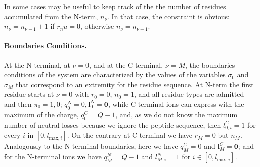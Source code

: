 In some cases may be useful to keep track of the the number of residues accumulated from the N-term, $n_\nu$. In that case, the constraint is obvious: $n_\nu=n_{\nu-1}+1$ if $r_nu=0$, otherwise $n_\nu=n_{\nu-1}$. 


\paragraph{Boundaries Conditions.}
At the N-terminal, at $\nu=0$, and at the C-terminal, $\nu=M$, the boundaries
conditions of the system are characterized by the values of
the variables $\sigma_0$ and $\sigma_M$ that correspond to an extremity for the
residue sequence. 
At N-term the
first residue starts at $\nu=0$ with $r_0=0$, $n_0=1$,  and all residue types are admitted
and then 
$\pi_0=1,0$; $q^N_0=0, \bm l^N_0=\bm 0$, while
C-terminal ions can express with the maximum of the charge, $q^C_0=Q-1$, and, as we
do not know the maximum number of neutral losses because we ignore the peptide sequence,
then $l^C_{0,i}=1$ for every $i$ in $[0,l_{\text{max},i}]$.
On the contrary at C-terminal we have $r_M=0$ but $n_M$.
Analogously to the N-terminal boundaries, here we have $q^C_M=0$ and $\bm
l^C_M=\bm 0$; and for the N-terminal ions we have $q^N_M=Q-1$ and
$l^N_{M,i}=1$ for $i\in[0,l_{\text{max},i}]$.

